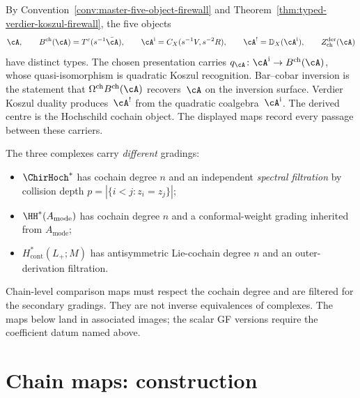 \begin{remark}
\label{rem:five-object-firewall-three-hochschild}
By Convention~\ref{conv:master-five-object-firewall} and
Theorem~\ref{thm:typed-verdier-koszul-firewall}, the five objects
\[
 \cA,\qquad
 B^{\mathrm{ch}}(\cA)=T^c(s^{-1}\bar{\cA}),\qquad
 \cA^{\mathrm i}=C_X(s^{-1}V,s^{-2}R),\qquad
 \cA^!=\mathbb D_X(\cA^{\mathrm i}),\qquad
 Z^{\mathrm{der}}_{\mathrm{ch}}(\cA)
\]
have distinct types.  The chosen presentation carries
$q_\cA\colon\cA^{\mathrm i}\to B^{\mathrm{ch}}(\cA)$, whose
quasi-isomorphism is quadratic Koszul recognition. Bar--cobar inversion is the statement that
$\Omega^{\mathrm{ch}}B^{\mathrm{ch}}(\cA)$ recovers~$\cA$ on the
inversion surface. Verdier Koszul duality produces~$\cA^!$ from the
quadratic coalgebra~$\cA^{\mathrm i}$. The derived centre is the
Hochschild cochain object.  The displayed maps record every passage
between these carriers.
\end{remark}

\begin{remark}
\label{rem:three-gradings}
The three complexes carry \emph{different} gradings:
\begin{itemize}[nosep]
\item $\ChirHoch^*$ has cochain degree $n$ and an independent
 \emph{spectral filtration} by collision depth
 $p = |\{i<j : z_i = z_j\}|$;
\item $\HH^*(A_{\mathrm{mode}})$ has cochain degree $n$ and a
 conformal-weight grading inherited from $A_{\mathrm{mode}}$;
\item $H^*_{\mathrm{cont}}(L_+;M)$ has antisymmetric
 Lie-cochain degree $n$ and an outer-derivation filtration.
\end{itemize}
Chain-level comparison maps must respect the cochain degree and are
filtered for the secondary gradings. They are not inverse equivalences
of complexes. The maps below land in associated images; the scalar
GF versions require the coefficient datum named above.
\end{remark}

\section{Chain maps: construction}
\label{sec:three-chain-maps}

